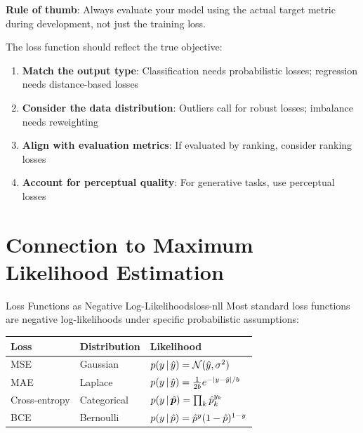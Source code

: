 \documentclass[../../main.tex]{subfiles}
\begin{document}
\begin{warning}
\textbf{Rule of thumb}: Always evaluate your model using the actual target metric during development, not just the training loss.
\end{warning}

\begin{principle}
The loss function should reflect the true objective:
\begin{enumerate}
    \item \textbf{Match the output type}: Classification needs probabilistic losses; regression needs distance-based losses
    \item \textbf{Consider the data distribution}: Outliers call for robust losses; imbalance needs reweighting
    \item \textbf{Align with evaluation metrics}: If evaluated by ranking, consider ranking losses
    \item \textbf{Account for perceptual quality}: For generative tasks, use perceptual losses
\end{enumerate}
\end{principle}

\section{Connection to Maximum Likelihood Estimation}
\label{sec:loss-mle}

\begin{theorem}{Loss Functions as Negative Log-Likelihoods}{loss-nll}
Most standard loss functions are negative log-likelihoods under specific probabilistic assumptions:

\begin{center}
\begin{tabular}{@{}lll@{}}
\toprule
\textbf{Loss} & \textbf{Distribution} & \textbf{Likelihood} \\
\midrule
MSE & Gaussian & $p(y \,|\, \hat{y}) = \mathcal{N}(\hat{y}, \sigma^2)$ \\
MAE & Laplace & $p(y \,|\, \hat{y}) = \frac{1}{2b}e^{-|y-\hat{y}|/b}$ \\
Cross-entropy & Categorical & $p(y \,|\, \hat{\boldsymbol{p}}) = \prod_k \hat{p}_k^{y_k}$ \\
BCE & Bernoulli & $p(y \,|\, \hat{p}) = \hat{p}^y(1-\hat{p})^{1-y}$ \\
\bottomrule
\end{tabular}
\end{center}
\end{theorem}
\end{document}
